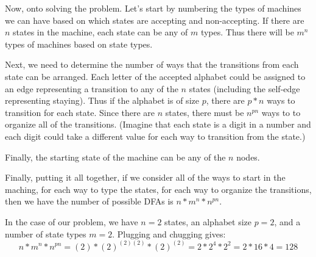 \documentclass{article}
\begin{document}
\begin{enumerate}
  Now, onto solving the problem. Let's start by numbering the types of machines we can have based on which states are accepting and non-accepting. If there are $n$ states in the machine, each state can be any of $m$ types. Thus there will be $m^n$ types of machines based on state types.

  Next, we need to determine the number of ways that the transitions from each state can be arranged. Each letter of the accepted alphabet could be assigned to an edge representing a transition to any of the $n$ states (including the self-edge representing staying). Thus if the alphabet is of size $p$, there are $p * n$ ways to transition for each state. Since there are $n$ states, there must be $n^{pn}$ ways to to organize all of the transitions. (Imagine that each state is a digit in a number and each digit could take a different value for each way to transition from the state.)

  Finally, the starting state of the machine can be any of the $n$ nodes.

  Finally, putting it all together, if we consider all of the ways to start in the maching, for each way to type the states, for each way to organize the transitions, then we have the number of possible DFAs is $n * m^{n} * n^{pn}$.

  In the case of our problem, we have $n = 2$ states, an alphabet size $p = 2$, and a number of state types $m = 2$. Plugging and chugging gives:
  $$n *m^{n} * n^{pn} = (2) * (2)^{(2)(2)} * (2)^{(2)} = 2 * 2^{4} * 2^{2} = 2 * 16 * 4 = 128$$
\end{enumerate}
\end{document}
